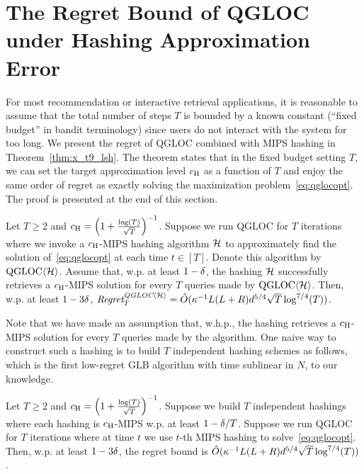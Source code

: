 \section{The Regret Bound of QGLOC under Hashing Approximation Error}
\vspace{-5pt}
For most recommendation or interactive retrieval applications, it is reasonable to assume that the total number of steps $T$ is bounded by a known constant (``fixed budget'' in bandit terminology) since users do not interact with the system for too long.
We present the regret of QGLOC combined with MIPS hashing in Theorem~\ref{thm:x_t9_lsh}.
The theorem states that in the fixed budget setting $T$, we can set the target approximation level $c_\text{\normalfont H}$ as a function of $T$ and enjoy the same order of regret as exactly solving the maximization problem~\eqref{eq:qglocopt}.
The proof is presented at the end of this section.
%
\begin{thm}\label{thm:x_t9_lsh}
  Let $T\ge 2$ and $\emph{\ensuremath{c_\text{\normalfont H}}} = \left(1 + { \frac{\log(T)}{\sqrt{T}} }\right)^{-1}$.
  Suppose we run QGLOC for $T$ iterations where we invoke a $c_\text{\normalfont H}$-MIPS hashing algorithm $\mathcal{H}$ to approximately find the solution of~\eqref{eq:qglocopt} at each time $t \in [T]$.
  Denote this algorithm by ${\text{\normalfont QGLOC}}{\langle}\mathcal{H}{\rangle}$.
  Assume that, w.p. at least $1-{\delta}$, the hashing $\mathcal{H}$ successfully retrieves a $c_\text{\normalfont H}$-MIPS solution for every $T$ queries made by ${\text{\normalfont QGLOC}}{\langle}\mathcal{H}{\rangle}$.
  Then, w.p. at least $1-3{\delta}$, $\emph{\text{Regret}}_T^{\emph{\text{QGLOC}}{\langle}\mathcal{H}{\rangle}} = \hat O( {\kappa}^{-1}L(L+R) d^{5/4} \sqrt{T} \log^{7/4}(T) ) $.
\end{thm}
%
Note that we have made an assumption that, w.h.p., the hashing retrieves a $c_\text{\normalfont H}$-MIPS solution for every $T$ queries made by the algorithm.
One naive way to construct such a hashing is to build $T$ independent hashing schemes as follows, which is the first low-regret GLB algorithm with time sublinear in $N$, to our knowledge.
\begin{cor}\label{cor:x_t9_lsh}
  Let $T\ge 2$ and $\emph{\ensuremath{c_\text{\normalfont H}}} = \left(1 + { \frac{\log(T)}{\sqrt{T}} }\right)^{-1}$.
  Suppose we build $T$ independent hashings where each hashing is $c_\text{\normalfont H}$-MIPS w.p. at least $1-{\delta}/T$.
  Suppose we run QGLOC for $T$ iterations where at time $t$ we use $t$-th MIPS hashing to solve~\eqref{eq:qglocopt}.
  Then, w.p. at least $1-3{\delta}$, the regret bound is $\hat O( {\kappa}^{-1}L(L+R) d^{5/4} \sqrt{T} \log^{7/4}(T) )$. 
\end{cor}
